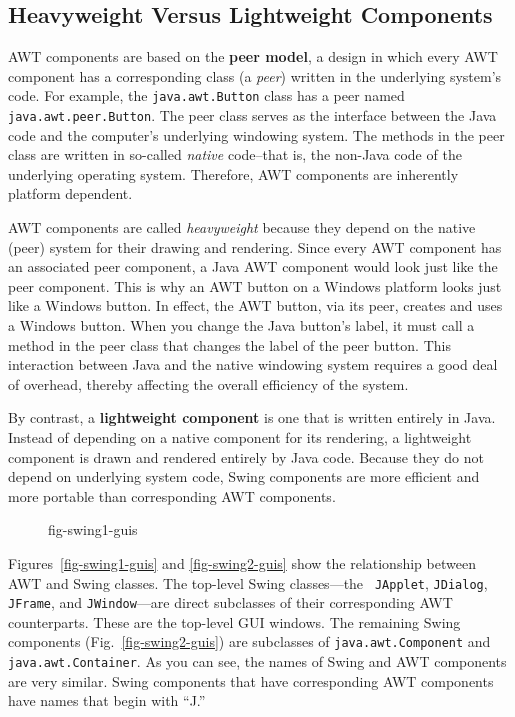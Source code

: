 \subsection{Heavyweight Versus Lightweight Components}
\noindent AWT components are based on the {\bf peer model}, a design
in which every AWT component has a corresponding class (a {\em peer})
written in the underlying  system's
code.  For example, the {\tt java.awt.Button} class has a peer named
{\tt java.awt.peer.Button}. The peer class serves as the interface
between the Java code and the computer's underlying  windowing system.
The methods in the peer class are written in so-called {\em native}
code--that is, the non-Java code of the underlying operating
system. Therefore, AWT components are inherently platform dependent.

AWT components are called {\it heavyweight} because they depend on the
native (peer) system for their drawing and rendering.  Since every
AWT component has an associated peer component, a Java AWT component
would look just like the peer component. This is why an AWT button on
a Windows platform looks just like a Windows button.  In effect, the
AWT button, via its peer, creates and uses a Windows button.  When you
change the Java button's label, it must call a method in the peer
class that changes the label of the peer button.  This interaction
between Java and the native windowing system requires a good deal of
overhead, thereby affecting the overall efficiency of the system.

By contrast, a {\bf lightweight component} is one that is written entirely 
in Java. Instead of depending on a native component for its rendering, a
lightweight component is drawn and rendered entirely by Java code.
Because they do not depend on underlying system code, Swing components are 
more efficient and more portable than corresponding AWT components.

\begin{figure}[tb]
{fig-swing1-guis}

\end{figure}

Figures~\ref{fig-swing1-guis} and \ref{fig-swing2-guis} show the relationship
between AWT and Swing classes. The top-level Swing classes---the {\tt
JApplet}, {\tt JDialog}, {\tt JFrame}, and {\tt JWindow}---are direct
subclasses of their corresponding AWT counterparts. These are the
top-level GUI windows. The remaining Swing components
(Fig.~\ref{fig-swing2-guis}) are subclasses of {\tt java.awt.Component}
and {\tt java.awt.Container}.  As you can see, the names of Swing and
AWT components are very similar. Swing components that have
corresponding AWT components have names that begin with ``J.''

